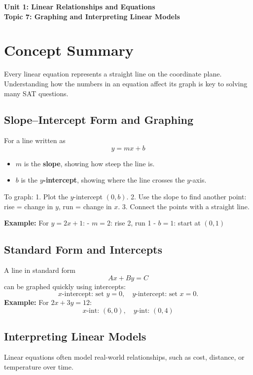 \documentclass[14pt]{extarticle}
\begin{document}
\raggedright
{}

\begin{center}
    \LARGE \textbf{Unit 1: Linear Relationships and Equations} \\[6pt]
    \Large \textbf{Topic 7: Graphing and Interpreting Linear Models}
\end{center}

\vspace{1em}

\section*{Concept Summary}

Every linear equation represents a straight line on the coordinate plane.  
Understanding how the numbers in an equation affect its graph is key to solving many SAT questions.

\subsection*{Slope–Intercept Form and Graphing}
For a line written as
\[
y = mx + b
\]
\begin{itemize}
    \item \(m\) is the \textbf{slope}, showing how steep the line is.
    \item \(b\) is the \textbf{\(y\)-intercept}, showing where the line crosses the \(y\)-axis.
\end{itemize}

To graph:
1. Plot the \(y\)-intercept \((0, b)\).
2. Use the slope to find another point:  
   rise = change in \(y\), run = change in \(x\).
3. Connect the points with a straight line.

\textbf{Example:}  
For \(y = 2x + 1\):
- \(m = 2\): rise 2, run 1  
- \(b = 1\): start at \((0, 1)\)

\subsection*{Standard Form and Intercepts}
A line in standard form
\[
Ax + By = C
\]
can be graphed quickly using intercepts:
\[
\text{\(x\)-intercept: set } y = 0, \quad \text{\(y\)-intercept: set } x = 0.
\]
\textbf{Example:}  
For \(2x + 3y = 12\):
\[
x\text{-int: } (6, 0), \quad y\text{-int: } (0, 4)
\]

\subsection*{Interpreting Linear Models}
Linear equations often model real-world relationships, such as cost, distance, or temperature over time.
\end{document}
